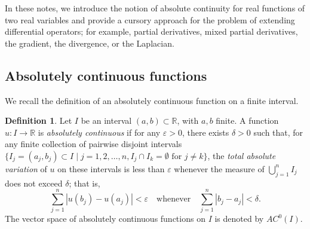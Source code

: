 \documentclass[11pt,leqno]{article}
\theoremstyle{plain}
\theoremstyle{definition}
\newtheorem{definition/}[lem]{Definition}
\newenvironment{definition}
  {\renewcommand{\qedsymbol}{\textdagger}%
   \pushQED{\qed}\begin{definition/}}
  {\popQED\end{definition/}}
\numberwithin{equation}{section}
\numberwithin{lem}{section}
\begin{document}
In these notes, we introduce the notion of absolute continuity for real functions of two real variables and provide a cursory approach for the problem of extending differential operators; for example, partial derivatives, mixed partial derivatives, the gradient, the divergence, or the Laplacian.
\subsection{Absolutely continuous functions}
We recall the definition of an absolutely continuous function on a finite interval.
\begin{definition}
    Let $I$ be an interval $(a,b)\subset \mathbb R$, with $a,b$ finite. A function $u\colon I\to \mathbb R$ is \textit{absolutely continuous} if for any $\varepsilon>0$, there exists $\delta >0$ such that, for any finite collection of pairwise disjoint intervals $\{I_j = (a_j,b_j)\subset I \mid j = 1,2,\dots,n, I_j\cap I_k = \emptyset \text{ for } j\neq k\}$, the \textit{total absolute variation} of $u$ on these intervals is less than $\varepsilon$ whenever the measure of $\bigcup_{j=1}^n I_j$ does not exceed $\delta$; that is,
\begin{equation}\label{1}
    \sum_{j=1}^n|u(b_j)-u(a_j)|<\varepsilon\quad\text{whenever}\quad \sum_{j=1}^n |b_j-a_j| < \delta.
\end{equation}
The vector space of absolutely continuous functions on $I$ is denoted by $AC^0(I)$.
\end{definition}
\end{document}
